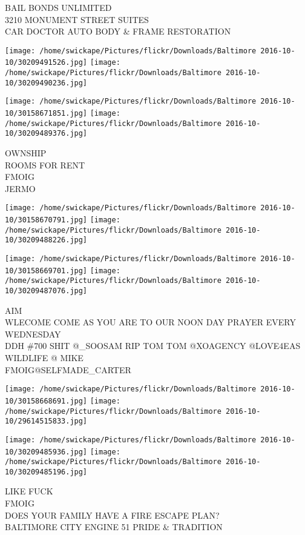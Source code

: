 \documentclass[10pt,letterpaper]{article}
\begin{document}
BAIL BONDS UNLIMITED\\
3210 MONUMENT STREET SUITES\\
CAR DOCTOR AUTO BODY \& FRAME RESTORATION
\pagebreak

\texttt{[image: /home/swickape/Pictures/flickr/Downloads/Baltimore 2016-10-10/30209491526.jpg]}
\texttt{[image: /home/swickape/Pictures/flickr/Downloads/Baltimore 2016-10-10/30209490236.jpg]}

\texttt{[image: /home/swickape/Pictures/flickr/Downloads/Baltimore 2016-10-10/30158671851.jpg]}
\texttt{[image: /home/swickape/Pictures/flickr/Downloads/Baltimore 2016-10-10/30209489376.jpg]}

OWNSHIP\\
ROOMS FOR RENT\\
FMOIG\\
JERMO
\pagebreak

\texttt{[image: /home/swickape/Pictures/flickr/Downloads/Baltimore 2016-10-10/30158670791.jpg]}
\texttt{[image: /home/swickape/Pictures/flickr/Downloads/Baltimore 2016-10-10/30209488226.jpg]}

\texttt{[image: /home/swickape/Pictures/flickr/Downloads/Baltimore 2016-10-10/30158669701.jpg]}
\texttt{[image: /home/swickape/Pictures/flickr/Downloads/Baltimore 2016-10-10/30209487076.jpg]}

AIM\\
WLECOME COME AS YOU ARE TO OUR NOON DAY PRAYER EVERY WEDNESDAY\\
DDH \#700 SHIT @\_SOOSAM RIP TOM TOM @XOAGENCY @LOVE4EAS WILDLIFE @ MIKE\\
FMOIG@SELFMADE\_CARTER
\pagebreak

\texttt{[image: /home/swickape/Pictures/flickr/Downloads/Baltimore 2016-10-10/30158668691.jpg]}
\texttt{[image: /home/swickape/Pictures/flickr/Downloads/Baltimore 2016-10-10/29614515833.jpg]}

\texttt{[image: /home/swickape/Pictures/flickr/Downloads/Baltimore 2016-10-10/30209485936.jpg]}
\texttt{[image: /home/swickape/Pictures/flickr/Downloads/Baltimore 2016-10-10/30209485196.jpg]}

LIKE FUCK\\
FMOIG\\
DOES YOUR FAMILY HAVE A FIRE ESCAPE PLAN?\\
BALTIMORE CITY ENGINE 51 PRIDE \& TRADITION
\pagebreak
\end{document}
